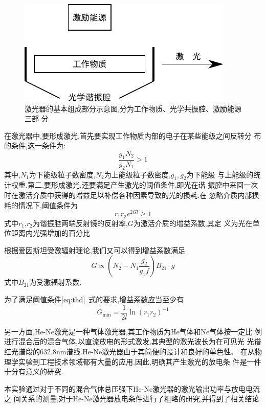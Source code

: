 \documentclass[aps,pre,12pt,preprint,onecolumn,showpacs,showkeys]{revtex4-1}
\begin{document}
\begin{figure}[htbp]
  \centering
\includegraphics[width=.5\textwidth]{graph1.pdf}
  \caption{\label{fig:laser}%
    激光器的基本组成部分示意图,分为工作物质、光学共振腔、激励能源三部
    分}
\end{figure} 

在激光器中,要形成激光,首先要实现工作物质内部的电子在某些能级之间反转分
布的条件,这一条件为:
\begin{equation}
  \label{eq:rvt}
  \frac{g_1N_2}{g_2N_1} > 1
\end{equation}
其中,$N_1$为下能级粒子数密度,$N_2$为上能级粒子数密度,$g_1,g_2$为下能级
与上能级的统计权重.第二,要形成激光,还要满足产生激光的阈值条件,即光在谐
振腔中来回一次时在激活介质中获得的增益足以补偿各种因素导致的光的损耗.在
忽略介质内部损耗的情况下,阈值条件为
\begin{equation}
  \label{eq:thd}
  r_1r_2e^{2Gl} \ge 1
\end{equation}
式中$r_1$,$r_2$为谐振腔两端反射镜的反射率,$G$为激活介质的增益系数,其定
义为光在单位距离内光强增加的百分比\cite{NCP}

根据爱因斯坦受激辐射理论,我们又可以得到增益系数满足
\begin{equation}
  \label{eq:amp}
  G \propto (N_2 - N_1 \frac{g_2}{g_1f})B_{21}\cdot g
\end{equation}
式中$B_{21}$为受激辐射系数.\cite{NCP}

为了满足阈值条件\ref{eq:thd}~式的要求,增益系数应当至少有
\begin{equation}
  \label{eq:Gmin}
  G_{\text{min}} = \frac{1}{2l}\ln(r_1r_2)^{-1}
\end{equation}

另一方面,He-Ne激光是一种气体激光器,其工作物质为He气体和Ne气体按一定比
例进行混合后的混合气体,以直流放电的形式激发,其典型的激光波长为在可见光
光谱红光谱段的632.8nm谱线.He-Ne激光器由于其简便的设计和良好的单色性、
在从物理学实验到工程技术领域都有大量的应用.因此,明确其产生激光的放电条
件是一件十分有意义的研究.\cite{wikiHeNe}

本实验通过对于不同的混合气体总压强下He-Ne激光器的激光输出功率与放电电流之
间关系的测量,对于He-Ne激光器放电条件进行了粗略的研究,并得到了相关结论.
 
\end{document}

